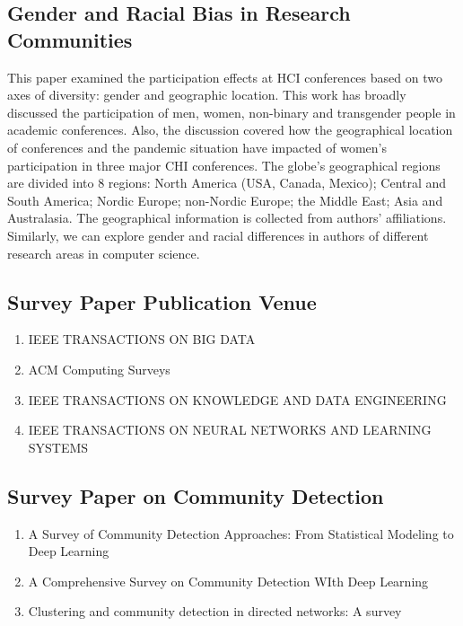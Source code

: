 \documentclass{article}
\begin{document}
\subsection{Gender and Racial Bias in Research Communities}
This paper \cite{mckay2022and} examined the participation effects at HCI conferences based on two axes of diversity: gender and geographic location. This work has broadly discussed the participation of men, women, non-binary and transgender people in academic conferences. Also, the discussion covered how the geographical location of conferences and the pandemic situation have impacted of women's participation in three major CHI conferences. The globe's geographical regions are divided into 8 regions: North America (USA, Canada, Mexico); Central and South America; Nordic Europe; non-Nordic Europe; the Middle East; Asia and Australasia. The geographical information is collected from authors' affiliations.  
Similarly, we can explore gender and racial differences in authors of different research areas in computer science. \cite{molwitz2023female}

\subsection{Survey Paper Publication Venue}
\begin{enumerate}
    \item IEEE TRANSACTIONS ON BIG DATA \cite{wang2022survey}
    \item ACM Computing Surveys \cite{tang2016survey}
    \item IEEE TRANSACTIONS ON KNOWLEDGE AND DATA ENGINEERING \cite{shi2016survey}
    \item IEEE TRANSACTIONS ON NEURAL NETWORKS AND LEARNING SYSTEMS \cite{su2022comprehensive}
    
\end{enumerate}
\subsection{Survey Paper on Community Detection}
\begin{enumerate}
    \item A Survey of Community Detection Approaches: From Statistical Modeling to Deep Learning \cite{jin2021survey}
    \item A Comprehensive Survey on Community Detection WIth Deep Learning \cite{su2022comprehensive}
    \item Clustering and community detection in directed networks: A survey \cite{malliaros2013clustering}
 \end{enumerate}  
\end{document}
